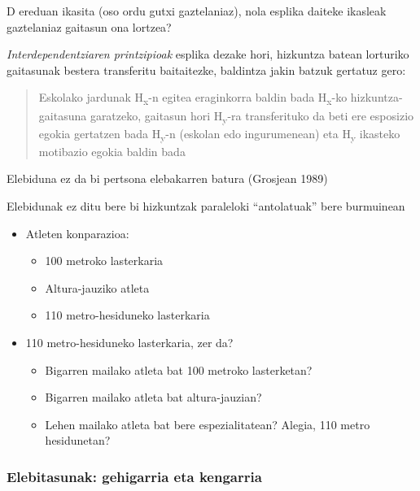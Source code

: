 \documentclass[
]{book}
\providecommand{\tightlist}{%
  \setlength{\itemsep}{0pt}\setlength{\parskip}{0pt}}
\begin{document}
D ereduan ikasita (oso ordu gutxi gaztelaniaz), nola esplika daiteke ikasleak gaztelaniaz gaitasun ona lortzea?

\emph{Interdependentziaren printzipioak} esplika dezake hori, hizkuntza batean lorturiko gaitasunak bestera transferitu baitaitezke, baldintza jakin batzuk gertatuz gero:

\begin{quote}
Eskolako jardunak H\textsubscript{x}-n egitea eraginkorra baldin bada H\textsubscript{x}-ko hizkuntza-gaitasuna garatzeko, gaitasun hori H\textsubscript{y}-ra transferituko da beti ere esposizio egokia gertatzen bada H\textsubscript{y}-n (eskolan edo ingurumenean) eta H\textsubscript{y} ikasteko motibazio egokia baldin bada
\end{quote}

Elebiduna ez da bi pertsona elebakarren batura (Grosjean 1989)

Elebidunak ez ditu bere bi hizkuntzak paraleloki ``antolatuak'' bere burmuinean

\begin{itemize}
\tightlist
\item
  Atleten konparazioa:

  \begin{itemize}
  \tightlist
  \item
    100 metroko lasterkaria
  \item
    Altura-jauziko atleta
  \item
    110 metro-hesiduneko lasterkaria
  \end{itemize}
\item
  110 metro-hesiduneko lasterkaria, zer da?

  \begin{itemize}
  \tightlist
  \item
    Bigarren mailako atleta bat 100 metroko lasterketan?
  \item
    Bigarren mailako atleta bat altura-jauzian?
  \item
    Lehen mailako atleta bat bere espezialitatean? Alegia, 110 metro hesidunetan?
  \end{itemize}
\end{itemize}

\hypertarget{elebitasunak-gehigarria-eta-kengarria}{%
\subsubsection{Elebitasunak: gehigarria eta kengarria}\label{elebitasunak-gehigarria-eta-kengarria}}
\end{document}
